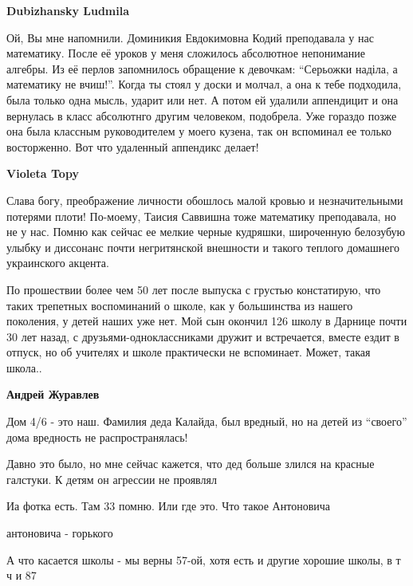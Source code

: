 \begin{itemize}
\begin{itemize}
\begin{itemize}
\textbf{Dubizhansky Ludmila} 

Ой, Вы мне напомнили. Доминикия Евдокимовна Кодий преподавала у нас математику.
После её уроков у меня сложилось абсолютное непонимание алгебры. Из её перлов
запомнилось обращение к девочкам: \enquote{Серьожки наділа, а математику не вчиш!}.
Когда ты стоял у доски и молчал, а она к тебе подходила, была только одна
мысль, ударит или нет. А потом ей удалили аппендицит и она вернулась в класс
абсолютнго другим человеком, подобрела. Уже гораздо позже она была классным
руководителем у моего кузена, так он вспоминал ее только восторженно. Вот что
удаленный аппендикс делает!

\textbf{Violeta Topy} 

Слава богу, преображение личности обошлось малой кровью и незначительными
потерями плоти! По-моему, Таисия Саввишна тоже математику преподавала, но не у
нас. Помню как сейчас ее мелкие черные кудряшки, широченную белозубую улыбку и
диссонанс почти негритянской внешности и такого теплого домашнего украинского
акцента.

По прошествии более чем 50 лет после выпуска с грустью констатирую, что таких
трепетных воспоминаний о школе, как у большинства из нашего поколения, у детей
наших уже нет. Мой сын окончил 126 школу в Дарнице почти 30 лет назад, с
друзьями-одноклассниками дружит и встречается, вместе ездит в отпуск, но об
учителях и школе практически не вспоминает. Может, такая школа..

\textbf{Андрей Журавлев} 

Дом 4/6 - это наш. Фамилия деда Калайда, был вредный, но на детей из \enquote{своего}
дома вредность не распространялась!

\end{itemize} %


Давно это было, но мне сейчас кажется, что дед больше злился на красные
галстуки. К детям он агрессии не проявлял

\end{itemize} %

Иа фотка есть. Там 33 помню. Или где это. Что такое Антоновича

антоновича - горького

А что касается школы - мы верны 57-ой, хотя есть и другие хорошие школы, в т ч
и 87


\end{itemize}
